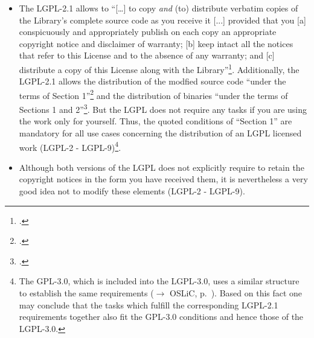 \begin{itemize}
  
  \item The LGPL-2.1 allows to \enquote{[\ldots] to copy \emph{and} (to)
  distribute verbatim copies of the Library's complete source code as you
  receive it [...] provided that you [a] conspicuously and appropriately publish
  on each copy an appropriate copyright notice and disclaimer of warranty; [b]
  keep intact all the notices that refer to this License and to the absence of
  any warranty; and [c] distribute a copy of this License along with the
  Library}\footcite[cf.][\nopage wp.\ §1, emphasizes by
  KR]{Lgpl21OsiLicense1999a}. Additionally, the LGPL-2.1 allows the distribution
  of the modfied source code \enquote{under the terms of Section
  1}\footcite[cf.][\nopage wp.\ §2]{Lgpl21OsiLicense1999a} and the distribution
  of binaries \enquote{under the terms of Sections 1 and
  2}\footcite[cf.][\nopage wp.\ §4]{Lgpl21OsiLicense1999a}. But the LGPL does
  not require any tasks if you are using the work only for yourself. Thus, the
  quoted conditions of \enquote{Section 1} are mandatory for all use cases
  concerning the distribution of an LGPL licensed work (LGPL-2 -
  LGPL-9)\footnote{The GPL-3.0, which is included into the LGPL-3.0, uses a
  similar structure to establish the same requirements ($\rightarrow$ OSLiC, p.\
  \pageref{Gpl3ConditionsDistri}). Based on this fact one may conclude that the
  tasks which fulfill the corresponding LGPL-2.1 requirements together also fit
  the GPL-3.0 conditions and hence those of the LGPL-3.0.}.

  \item Although both versions of the LGPL does not explicitly require to retain
  the copyright notices in the form you have received them, it is nevertheless a
  very good idea not to modify these elements (LGPL-2 - LGPL-9).
  

\end{itemize}
